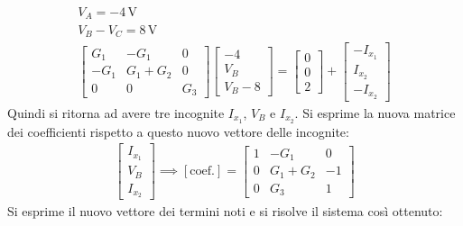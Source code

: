 \documentclass{article}
\newcommand{\SI}[1]{\mathrm{#1}}
\numberwithin{equation}{subsection}
\begin{document}
\begin{gather*}
    V_A=-4\,\SI{V}\\
    V_B-V_C=8\,\SI{V}\\
    \begin{bmatrix}
        G_1&-G_1&0\\-G_1&G_1+G_2&0\\0&0&G_3
    \end{bmatrix}\begin{bmatrix}
        -4\\V_B\\V_B-8
    \end{bmatrix}=\begin{bmatrix}
        0\\0\\2
    \end{bmatrix}+\begin{bmatrix}
        -I_{x_1}\\I_{x_2}\\-I_{x_2}
    \end{bmatrix}
\end{gather*}
Quindi si ritorna ad avere tre incognite $I_{x_1}$, $V_B$ e $I_{x_2}$. Si esprime la nuova matrice dei coefficienti rispetto a questo nuovo vettore delle incognite:
\begin{gather*}
    \begin{bmatrix}
        I_{x_1}\\V_B\\I_{x_2}
    \end{bmatrix}\implies\left[\mathrm{coef.}\right]=\begin{bmatrix}
        1&-G_1&0\\0&G_1+G_2&-1\\0&G_3&1
    \end{bmatrix}
\end{gather*}
Si esprime il nuovo vettore dei termini noti e si risolve il sistema così ottenuto:
\end{document}
